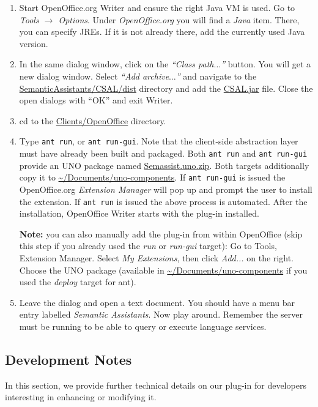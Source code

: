 \begin{enumerate}

  \item Start OpenOffice.org Writer and ensure the right Java VM is
  used. Go to \emph{Tools $\rightarrow$ Options}. Under
  \emph{OpenOffice.org} you will find a \emph{Java} item. There, you
  can specify JREs. If it is not already there, add the currently used
  Java version.
  
  \item In the same dialog window, click on the \emph{``Class
      path$\ldots$''} button.  You will get a new dialog
    window. Select \emph{``Add archive$\ldots$''} and navigate to the
    \url{SemanticAssistants/CSAL/dist} directory and add the
    \url{CSAL.jar} file.  Close the open dialogs with
    ``OK'' and exit Writer.

  \item cd to the \url{Clients/OpenOffice} directory.

  \item Type \texttt{ant run}, or \texttt{ant run-gui}. Note that the
    client-side abstraction layer must have already been built and
    packaged. Both \texttt{ant run} and \texttt{ant run-gui} provide an UNO
    package named \url{Semassist.uno.zip}. Both targets additionally copy
    it to \url{~/Documents/uno-components}.  If \texttt{ant run-gui} is issued
    the OpenOffice.org \emph{Extension Manager} will pop up and prompt the
    user to install the extension.  If \texttt{ant run} is issued the above
    process is automated.  After the installation, OpenOffice Writer starts
    with the plug-in installed. 

    \textbf{Note:} you can also manually add the plug-in from within
    OpenOffice (skip this step if you already used the \emph{run} or
    \emph{run-gui} target): Go to Tools, Extension Manager. Select
    \emph{My Extensions}, then click \emph{Add...} on the
    right. Choose the UNO package (available in
    \url{~/Documents/uno-components} if you used the \emph{deploy}
    target for ant).

  \item Leave the dialog and open a text document. You should have a
    menu bar entry labelled \emph{Semantic Assistants}. Now play
    around. Remember the server must be running to be able to query or
    execute language services.
\end{enumerate}


\subsection{Development Notes}
\label{sec:oo-spec}
In this section, we provide further technical details on our plug-in
for developers interesting in enhancing or modifying it.


